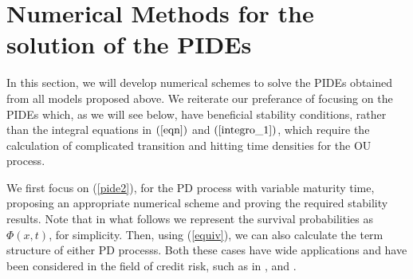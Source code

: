 \documentclass[11pt,reqno]{article}
\newtheorem{proposition}[theorem]{Proposition}
\theoremstyle{definition}
\newtheorem{remark}[theorem]{Remark}
\begin{document}

\section{Numerical Methods for the solution of the PIDEs}
In this section, we will develop numerical schemes to solve the PIDEs obtained from all models proposed above. We reiterate our preferance of focusing on the PIDEs which, as we will see below, have beneficial stability conditions, rather than the integral equations in $(\ref{eqn})$ and $(\ref{integro_1})$, which require the calculation of complicated transition and hitting time densities for the OU process.
\par We first focus on (\ref{pide2}), for the PD process with variable maturity time, proposing an appropriate numerical scheme and proving the required stability results. Note that in what follows we represent the survival probabilities as $\Phi(x,t)$, for simplicity. Then, using (\ref{equiv}), we can also calculate the term structure of either PD processs. Both these cases have wide applications and have been considered in the field of credit risk, such as in \cite{schoutens2010levy}, \cite{zhou1997jump} and \cite{ballotta2015counterparty}.
 
\end{document}
